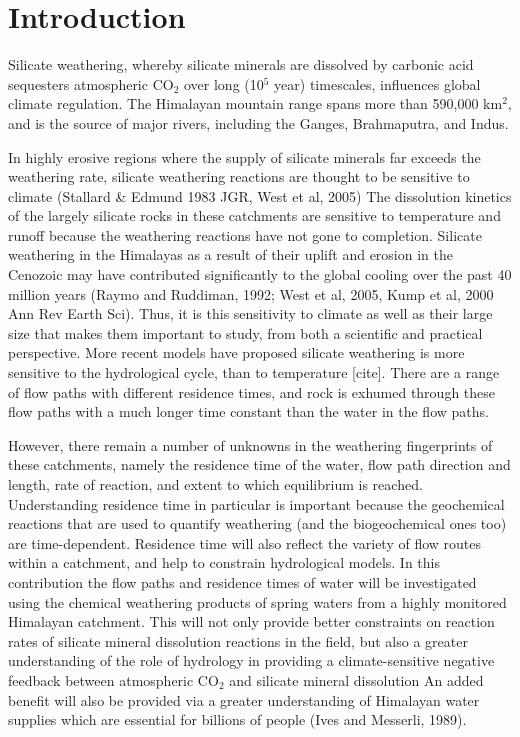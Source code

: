 
\section{Introduction}



Silicate weathering, whereby silicate minerals are dissolved by carbonic acid 
sequesters atmospheric CO$_2$ over long (10$^5$ year) timescales, influences global climate regulation.
The Himalayan mountain range spans more than 590,000 km$^2$, and is the source of major rivers, including the Ganges, Brahmaputra, and Indus. 


\bsk

In highly erosive regions where the supply of silicate minerals far exceeds the weathering rate, silicate weathering reactions are thought to be sensitive to climate (Stallard \& Edmund 1983 JGR, West et al, 2005) The dissolution kinetics of the largely silicate rocks in these catchments are sensitive to temperature and runoff because the weathering reactions have not gone to completion. Silicate weathering in the Himalayas as a result of their uplift and erosion in the Cenozoic may have contributed significantly to the global 
cooling over the past 40 million years %
(Raymo and Ruddiman, 1992; West et al, 2005, Kump et al, 2000 Ann Rev Earth Sci). 
Thus, it is this sensitivity to climate as well as their large size that makes them important to study, from both a scientific and practical perspective. More recent models have proposed silicate weathering is more sensitive to the hydrological cycle, than to temperature [cite]. There are a range of flow paths with different residence times, and rock is exhumed through these flow paths with a much longer time constant than the water in the flow paths.

\bsk

However, there remain a number of unknowns in the weathering fingerprints of these catchments, namely the residence time of the water,
flow path direction and length, rate of reaction, and extent to which equilibrium is reached.
Understanding residence time in particular is important because the geochemical reactions that are used to quantify weathering 
(and the biogeochemical ones too) are time-dependent.
Residence time will also reflect the variety of flow routes within a catchment, and help to constrain hydrological models. In this contribution the flow paths and residence times of water will be investigated using the chemical weathering products of spring waters from a highly monitored Himalayan catchment. This will not only provide better constraints on reaction rates of silicate mineral dissolution reactions in the field, but also a greater understanding of the role of hydrology in providing a climate-sensitive negative feedback between atmospheric CO$_2$ and silicate mineral dissolution
An added benefit will also be provided via a greater understanding of Himalayan water supplies which are essential for billions of people (Ives and Messerli, 1989). 

